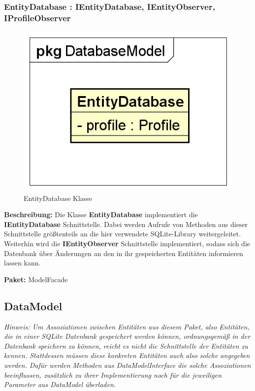 \documentclass[a4paper]{scrreprt}
\begin{document}
\subsubsection{EntityDatabase : IEntityDatabase, IEntityObserver, IProfileObserver}
\begin{figure}[H]
\centering
\includegraphics[width=0.45\textheight]{graphics/Klassendiagramme/Model/EntityDatabase.png}
\caption{EntityDatabase Klasse}
\end{figure}
\textbf{Beschreibung:} Die Klasse \textbf{EntityDatabase} implementiert die \textbf{IEntityDatabase} Schnittstelle. Dabei werden Aufrufe von Methoden aus dieser Schnittstelle größtenteils an die hier verwendete SQLite-Library weitergeleitet.\\
Weiterhin wird die \textbf{IEntityObserver} Schnittstelle implementiert, sodass sich die Datenbank über Änderungen an den in ihr gespeicherten Entitäten informieren lassen kann.

\textbf{Paket:} ModelFacade

\subsection{DataModel}
\textit{Hinweis: Um Assoziationen zwischen Entitäten aus diesem Paket, also Entitäten, die in einer SQLite Datenbank gespeichert werden können, ordnungsgemäß in der Datenbank speichern zu können, reicht es nicht die Schnittstelle der Entitäten zu kennen. Stattdessen müssen diese konkreten Entitäten auch also solche angegeben werden. Dafür werden Methoden aus DataModelInterface die solche Assoziationen beeinflussen, zusätzlich zu ihrer Implementierung noch für die jeweiligen Parameter aus DataModel überladen.}
\end{document}
